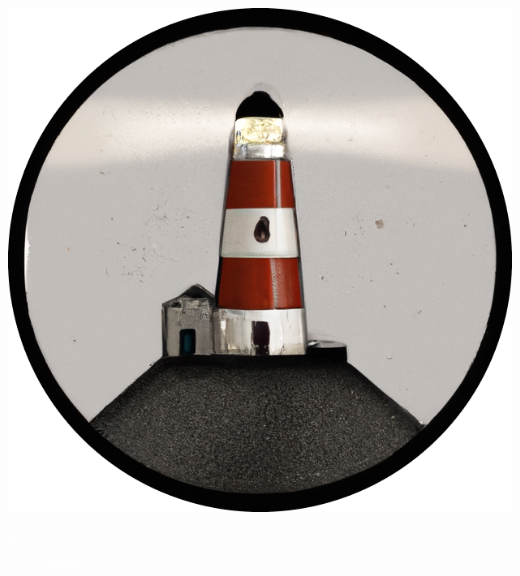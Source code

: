 \documentclass[11pt]{article}
\begin{document}

\pagecolor{black}


\vspace*{9cm}

\begin{center}
	\includegraphics[width=.3\textwidth]{logo.png}

	\vspace*{5cm}

	\Huge \bfseries \textcolor{white}{\textsc{beacon}} \\
	\Huge \bfseries \textcolor{white}{User guide}
  
\end{center}

\end{document}
